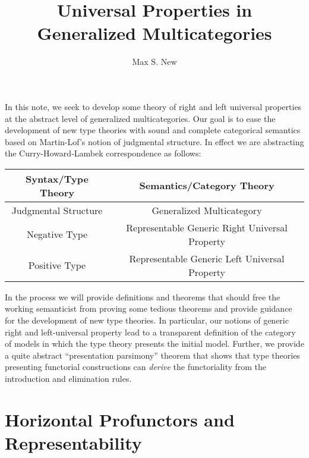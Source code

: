 \documentclass{article}
\begin{document}
\newtheorem{theorem}{Theorem}
\newtheorem{definition}{Definition}
\newcommand{\pto}{\nrightarrow}
\newcommand{\pfrom}{\nleftarrow}
\newcommand{\vcat}{\mathcal}
\newcommand{\cat}{\mathbb}
\newcommand{\vtkmnd}{\mathbb{K}\text{Mod}(\vcat{V},T)}
\newcommand{\rmod}{\text{RMod}}
\newcommand{\lmod}{\text{LMod}}

\title{Universal Properties in Generalized Multicategories}
\author{Max S. New}

\maketitle

In this note, we seek to develop some theory of right and left
universal properties at the abstract level of generalized
multicategories.
%
Our goal is to ease the development of new type theories with sound
and complete categorical semantics based on Martin-Lof's notion of
judgmental structure.
%
In effect we are abstracting the Curry-Howard-Lambek correspondence as
follows:

\begin{tabular}{|c|c|}
  \hline
  Syntax/Type Theory & Semantics/Category Theory\\ \hline \hline
  Judgmental Structure & Generalized Multicategory\\ \hline
  Negative Type & Representable Generic Right Universal Property\\ \hline
  Positive Type & Representable Generic Left Universal Property\\ \hline  
\end{tabular}

In the process we will provide definitions and theorems that should
free the working semanticist from proving some tedious theorems and
provide guidance for the development of new type theories.
%
In particular, our notions of generic right and left-universal
property lead to a transparent definition of the category of models in
which the type theory presents the initial model.
Further, we provide a quite abstract ``presentation parsimony''
theorem that shows that type theories presenting functorial
constructions can \emph{derive} the functoriality from the
introduction and elimination rules.

\section{Horizontal Profunctors and Representability}
\end{document}
